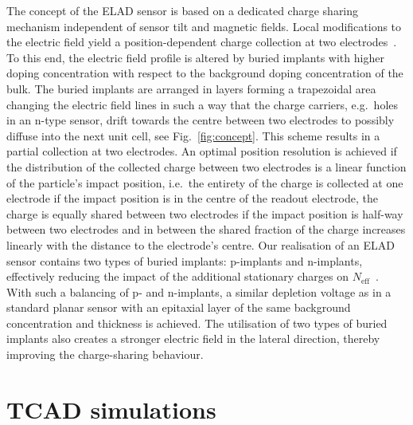 \documentclass[a4paper,11pt]{article}
\begin{document}
The concept of the ELAD sensor is based on a dedicated charge sharing mechanism independent of sensor tilt and magnetic fields.
Local modifications to the electric field yield a position-dependent charge collection at two electrodes~\cite{hj}.
To this end, the electric field profile is altered by buried implants with higher doping concentration with respect to the background doping concentration of the bulk. 
The buried implants are arranged in layers forming a trapezoidal area changing the electric field lines in such a way
 that the charge carriers, e.g.\ holes in an n-type sensor, drift towards the centre between two electrodes to possibly diffuse into the next unit cell, see Fig.~\ref{fig:concept}.
This scheme results in a partial collection at two electrodes.
An optimal position resolution is achieved if the distribution of the collected charge between two electrodes is a linear function of the particle's impact position, 
 i.e.\ the entirety of the charge is collected at one electrode if the impact position is in the centre of the readout electrode,
 the charge is equally shared between two electrodes if the impact position is half-way between two electrodes
 and in between the shared fraction of the charge increases linearly with the distance to the electrode's centre.
Our realisation of an ELAD sensor contains two types of buried implants: p-implants and n-implants, effectively reducing the impact of the additional stationary charges on $N\mathrm{_{eff}}$~\cite{elad}. 
With such a balancing of p- and n-implants, a similar depletion voltage as in a standard planar sensor with an epitaxial layer of the same background concentration and thickness is achieved.
The utilisation of two types of buried implants also creates a stronger electric field in the lateral direction, thereby improving the charge-sharing behaviour.
 

\section{TCAD simulations}
\label{sec:sim}
\end{document}
